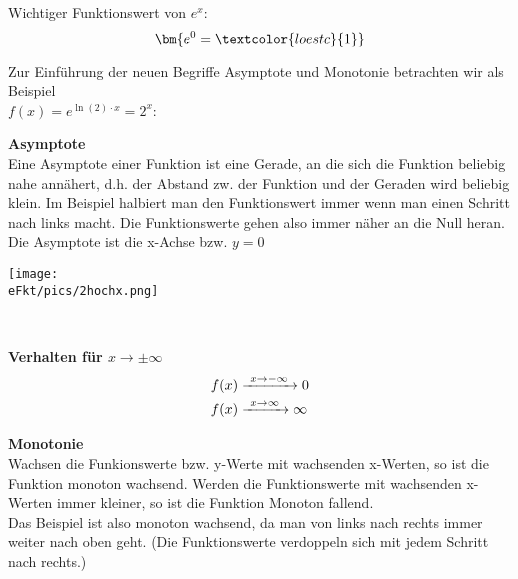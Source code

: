 \begin{tcolorbox}Wichtiger Funktionswert von \(e^x\):
	\[\bm{e^0=\textcolor{loestc}{1}}\]
\end{tcolorbox}
\newpage
Zur Einführung der neuen Begriffe Asymptote und Monotonie betrachten wir als Beispiel\\ \(f(x)=e^{\ln(2)\cdot x}=2^x\):\vspace{0.5cm}\\
\begin{minipage}{\textwidth}
	\begin{minipage}{0.55\textwidth}
		\begin{tcolorbox}
			\textbf{Asymptote}\\
			\textcolor{loestc}{Eine Asymptote einer Funktion ist eine Gerade, an die sich die Funktion beliebig nahe annähert, d.h. der Abstand zw. der Funktion und der Geraden wird beliebig klein. Im Beispiel halbiert man den Funktionswert immer wenn man einen Schritt nach links macht. Die Funktionswerte gehen also immer näher an die Null heran. Die Asymptote ist die x-Achse bzw. \(y=0\)}\vspace{2.7cm}
		\end{tcolorbox}
	\end{minipage}
	\begin{minipage}{0.44\textwidth}
		\begin{minipage}[t]{0.95\textwidth}
			\texttt{[image: \\eFkt/pics/2hochx.png]}
		\end{minipage}
	\end{minipage}
\end{minipage}\\
\begin{tcolorbox}
	\textbf{Verhalten für \(x\rightarrow \pm\infty\)}
	\textcolor{loestc}{
		\begin{align*}
			f(x)&\xrightarrow{\hphantom{\ }x\to-\infty\hphantom{\ }}0\\
			f(x)&\xrightarrow{\hphantom{\ }x\to\infty\hphantom{\ }}\infty
	\end{align*}}
\end{tcolorbox}
\begin{tcolorbox}
	\textbf{Monotonie}\\
	\textcolor{loestc}{
		Wachsen die Funkionswerte bzw. y-Werte mit wachsenden x-Werten, so ist die Funktion monoton wachsend. Werden die Funktionswerte mit wachsenden x-Werten immer kleiner, so ist die Funktion Monoton fallend.\\
		Das Beispiel ist also monoton wachsend, da man von links nach rechts immer weiter nach oben geht. (Die Funktionswerte verdoppeln sich mit jedem Schritt nach rechts.)\vspace{3cm}}
\end{tcolorbox}
